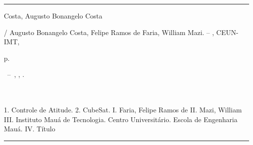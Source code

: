 \documentclass[
	12pt,				%
	openany,			%
	twoside,			%
	a4paper,			%
	english,			%
	french,				%
	spanish,			%
	brazil,				%
	oldfontcommands
	]{abntex2}
\begin{document}
\frenchspacing


\imprimircapa

\imprimirfolhaderosto*


%
%     
\begin{fichacatalografica}
	\vspace*{\fill}					%
	\hrule							%
	\begin{center}					%
	\begin{minipage}[c]{12.5cm}		%
	
	Costa, Augusto Bonangelo Costa
	
	\hspace{0.5cm} \imprimirtitulo  / Augusto Bonangelo Costa, Felipe Ramos de Faria, William Mazi. --
	\imprimirlocal, CEUN-IMT, \imprimirdata
	
	\hspace{0.5cm} \pageref{LastPage} p.\\
	
	\hspace{0.5cm}
	\parbox[t]{\textwidth}{\imprimirtipotrabalho~--~\imprimirinstituicao,
	\imprimirlocal, \imprimirdata.}\\
	
	\hspace{0.5cm} \imprimirorientadorRotulo~\imprimirorientador\\
	
	\hspace{0.5cm}
		1. Controle de Atitude.
		2. CubeSat.
		I. Faria, Felipe Ramos de
		II. Mazi, William
		III. Instituto Mauá de Tecnologia. Centro Universitário. Escola de Engenharia Mauá.
		IV. Título\\ 			
	
	
	\end{minipage}
	\end{center}
	\hrule
\end{fichacatalografica}
\end{document}
